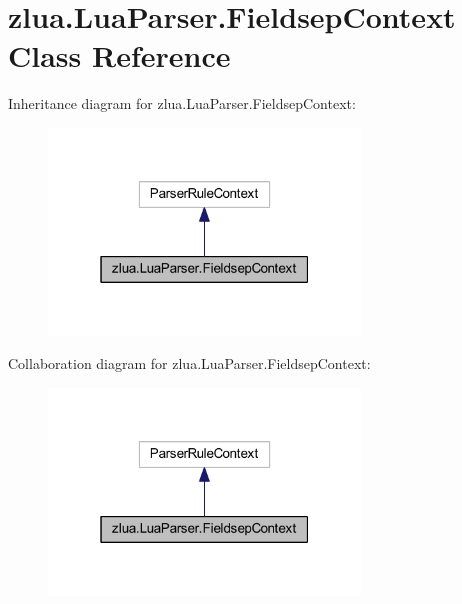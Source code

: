 \hypertarget{classzlua_1_1_lua_parser_1_1_fieldsep_context}{}\section{zlua.\+Lua\+Parser.\+Fieldsep\+Context Class Reference}
\label{classzlua_1_1_lua_parser_1_1_fieldsep_context}


Inheritance diagram for zlua.\+Lua\+Parser.\+Fieldsep\+Context\+:
\nopagebreak
\begin{figure}[H]
\begin{center}
\leavevmode
\includegraphics[width=235pt]{classzlua_1_1_lua_parser_1_1_fieldsep_context__inherit__graph}
\end{center}
\end{figure}


Collaboration diagram for zlua.\+Lua\+Parser.\+Fieldsep\+Context\+:
\nopagebreak
\begin{figure}[H]
\begin{center}
\leavevmode
\includegraphics[width=235pt]{classzlua_1_1_lua_parser_1_1_fieldsep_context__coll__graph}
\end{center}
\end{figure}
